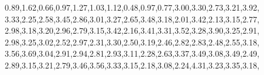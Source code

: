 \documentclass[
]{article}
\newenvironment{Shaded}{\begin{snugshade}}{\end{snugshade}}
\newcommand{\FloatTok}[1]{\textcolor[rgb]{0.00,0.00,0.81}{#1}}
\newcommand{\NormalTok}[1]{#1}
\begin{document}
\begin{Shaded}
\begin{Highlighting}[]
               \FloatTok{0.89}\NormalTok{,}\FloatTok{1.62}\NormalTok{,}\FloatTok{0.66}\NormalTok{,}\FloatTok{0.97}\NormalTok{,}\FloatTok{1.27}\NormalTok{,}\FloatTok{1.03}\NormalTok{,}\FloatTok{1.12}\NormalTok{,}\FloatTok{0.48}\NormalTok{,}\FloatTok{0.97}\NormalTok{,}\FloatTok{0.77}\NormalTok{,}\FloatTok{3.00}\NormalTok{,}\FloatTok{3.30}\NormalTok{,}\FloatTok{2.73}\NormalTok{,}\FloatTok{3.21}\NormalTok{,}\FloatTok{3.92}\NormalTok{,}
               \FloatTok{3.33}\NormalTok{,}\FloatTok{2.25}\NormalTok{,}\FloatTok{2.58}\NormalTok{,}\FloatTok{3.45}\NormalTok{,}\FloatTok{2.86}\NormalTok{,}\FloatTok{3.01}\NormalTok{,}\FloatTok{3.27}\NormalTok{,}\FloatTok{2.65}\NormalTok{,}\FloatTok{3.48}\NormalTok{,}\FloatTok{3.18}\NormalTok{,}\FloatTok{2.01}\NormalTok{,}\FloatTok{3.42}\NormalTok{,}\FloatTok{2.13}\NormalTok{,}\FloatTok{3.15}\NormalTok{,}\FloatTok{2.77}\NormalTok{,}
               \FloatTok{2.98}\NormalTok{,}\FloatTok{3.18}\NormalTok{,}\FloatTok{3.20}\NormalTok{,}\FloatTok{2.96}\NormalTok{,}\FloatTok{2.79}\NormalTok{,}\FloatTok{3.15}\NormalTok{,}\FloatTok{3.42}\NormalTok{,}\FloatTok{2.16}\NormalTok{,}\FloatTok{3.41}\NormalTok{,}\FloatTok{3.31}\NormalTok{,}\FloatTok{3.52}\NormalTok{,}\FloatTok{3.28}\NormalTok{,}\FloatTok{3.90}\NormalTok{,}\FloatTok{3.25}\NormalTok{,}\FloatTok{2.91}\NormalTok{,}
               \FloatTok{2.98}\NormalTok{,}\FloatTok{3.25}\NormalTok{,}\FloatTok{3.02}\NormalTok{,}\FloatTok{2.52}\NormalTok{,}\FloatTok{2.97}\NormalTok{,}\FloatTok{2.31}\NormalTok{,}\FloatTok{3.30}\NormalTok{,}\FloatTok{2.50}\NormalTok{,}\FloatTok{3.19}\NormalTok{,}\FloatTok{2.46}\NormalTok{,}\FloatTok{2.82}\NormalTok{,}\FloatTok{2.83}\NormalTok{,}\FloatTok{2.48}\NormalTok{,}\FloatTok{2.55}\NormalTok{,}\FloatTok{3.18}\NormalTok{,}
               \FloatTok{3.56}\NormalTok{,}\FloatTok{3.69}\NormalTok{,}\FloatTok{3.04}\NormalTok{,}\FloatTok{2.91}\NormalTok{,}\FloatTok{2.94}\NormalTok{,}\FloatTok{2.81}\NormalTok{,}\FloatTok{2.93}\NormalTok{,}\FloatTok{3.11}\NormalTok{,}\FloatTok{2.28}\NormalTok{,}\FloatTok{2.63}\NormalTok{,}\FloatTok{3.37}\NormalTok{,}\FloatTok{3.49}\NormalTok{,}\FloatTok{3.08}\NormalTok{,}\FloatTok{3.49}\NormalTok{,}\FloatTok{2.49}\NormalTok{,}
               \FloatTok{2.89}\NormalTok{,}\FloatTok{3.15}\NormalTok{,}\FloatTok{3.21}\NormalTok{,}\FloatTok{2.79}\NormalTok{,}\FloatTok{3.46}\NormalTok{,}\FloatTok{3.56}\NormalTok{,}\FloatTok{3.33}\NormalTok{,}\FloatTok{3.15}\NormalTok{,}\FloatTok{2.18}\NormalTok{,}\FloatTok{3.08}\NormalTok{,}\FloatTok{2.24}\NormalTok{,}\FloatTok{4.31}\NormalTok{,}\FloatTok{3.23}\NormalTok{,}\FloatTok{3.35}\NormalTok{,}\FloatTok{3.18}\NormalTok{,}

\end{Highlighting}
\end{Shaded}
\end{document}
